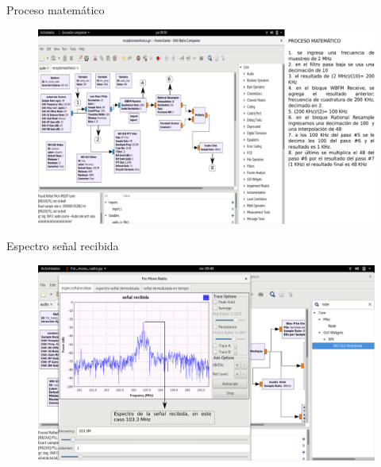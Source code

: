 \begin{frame}{Proceso matemático}

\begin{figure}[H]
\centering
\vspace{-3mm}
\includegraphics[width=\textwidth]{parte3/lab8/pdf/lab8_6.pdf}
\end{figure}

\end{frame}

\begin{frame}{Espectro señal recibida}

\begin{figure}[H]
\centering
\vspace{-3mm}
\includegraphics[width=\textwidth]{parte3/lab8/pdf/lab8_7.pdf}
\end{figure}

\end{frame}

